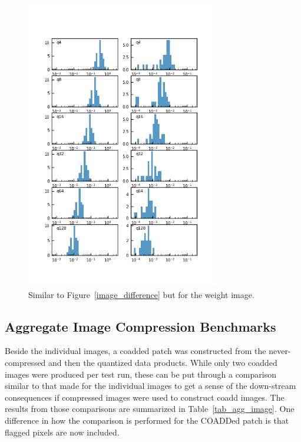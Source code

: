 \begin{figure}
\centering
\includegraphics[width=0.75\textwidth]{figure/compression_metric_v2w.png}
\caption{Similar to Figure~\ref{image_difference} but for the weight image.}
\label{weight_difference}
\end{figure}


\subsection{Aggregate Image Compression Benchmarks}

Beside the individual images, a coadded patch was constructed from the never-compressed and then the quantized data 
products.  While only two coadded images were produced per test run, these can be put through a comparison similar 
to that made for the individual images to get a sense of the down-stream consequences if compressed images were used
to construct coadd images.  The results from those comparisons are summarized in Table~\ref{tab_agg_image}.  One 
difference in how the comparison is performed for the COADDed patch is that flagged pixels are now included.


